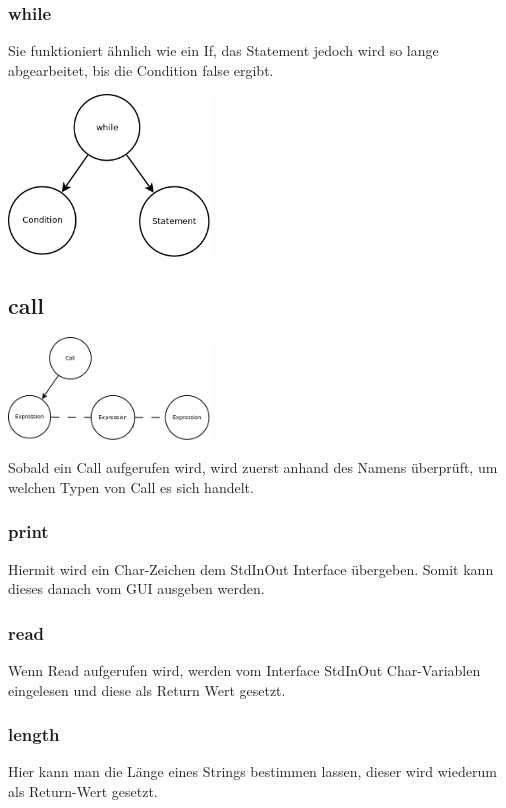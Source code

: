 \subsubsection{while}
Sie funktioniert ähnlich wie ein If, das Statement jedoch wird so lange abgearbeitet, bis die Condition false ergibt.

\includegraphics[width=0.4\textwidth]{./media/images/interpreter/syntaxbaum/statements/while.png}

\subsection{call}
\includegraphics[width=0.4\textwidth]{./media/images/interpreter/syntaxbaum/statements/call.png}

Sobald ein Call aufgerufen wird, wird zuerst anhand des Namens überprüft, um welchen Typen von Call es sich handelt.

\subsubsection{print}
Hiermit wird ein Char-Zeichen dem StdInOut Interface übergeben. Somit kann dieses danach vom GUI ausgeben werden.

\subsubsection{read}
Wenn Read aufgerufen wird, werden vom Interface StdInOut Char-Variablen eingelesen und diese als Return Wert gesetzt.

\subsubsection{length}
Hier kann man die Länge eines Strings bestimmen lassen, dieser wird wiederum als Return-Wert gesetzt.

